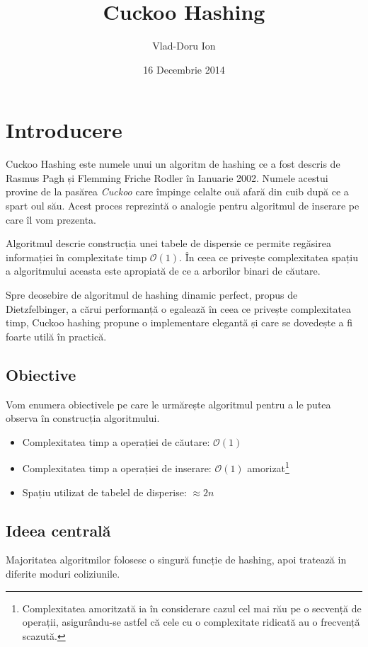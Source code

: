 \documentclass[a4paper]{article}
\title{\textbf{Cuckoo Hashing}}
\author{Vlad-Doru Ion}
\date{16 Decembrie 2014}
\affil{Facultatea de Matematica si Informatica \\ Universitatea din Bucuresti}
\theoremstyle{remark}
\theoremstyle{definition}
\def\o1{$\mathcal{O}(1)$}
\begin{document}
\maketitle

\section{Introducere}

Cuckoo Hashing este numele unui un algoritm de hashing ce a fost descris de Rasmus Pagh și Flemming Friche Rodler în Ianuarie 2002. Numele acestui provine de la pasărea \textit{Cuckoo} care împinge celalte ouă afară din cuib după ce a spart oul său. Acest proces reprezintă o analogie pentru algoritmul de inserare pe care îl vom prezenta.

Algoritmul descrie construcția unei tabele de dispersie ce permite regăsirea informației în complexitate timp \o1. În ceea ce privește complexitatea spațiu a algoritmului aceasta este apropiată de ce a arborilor binari de căutare.

Spre deosebire de algoritmul de hashing dinamic perfect, propus de Dietzfelbinger, a cărui performanță o egalează în ceea ce privește complexitatea timp, Cuckoo hashing propune o implementare elegantă și care se dovedește a fi foarte utilă în practică.

\subsection {Obiective}

Vom enumera obiectivele pe care le urmărește algoritmul pentru a le putea observa în construcția algoritmului.
\begin{itemize}
\item Complexitatea timp a operației de căutare: $\mathcal{O}(1)$
\item Complexitatea timp a operației de inserare: $\mathcal{O}(1)$ amorizat\footnote{Complexitatea amoritzată ia în considerare cazul cel mai rău pe o secvență de operații, asigurându-se astfel că cele cu o complexitate ridicată au o frecvență scazută.}
\item Spațiu utilizat de tabelel de disperise: $\approx 2n$
\end{itemize}

\subsection {Ideea centrală}

Majoritatea algoritmilor folosesc o singură funcție de hashing, apoi tratează in diferite moduri coliziunile.
\end{document}
